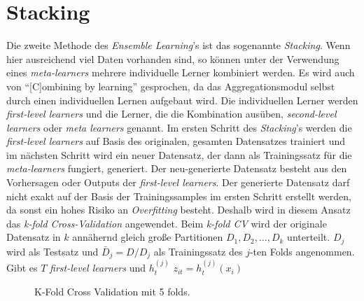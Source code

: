 \section{Stacking}
Die zweite Methode des \textit{Ensemble Learning}'s ist das sogenannte \textit{Stacking}. Wenn hier ausreichend viel Daten vorhanden sind, so können unter der Verwendung eines \textit{meta-learners} mehrere individuelle Lerner kombiniert werden. Es wird auch von \enquote{[C]ombining by learning}\autocite[S.196]{Zhou.2021} gesprochen, da das Aggregationsmodul selbst durch einen individuellen Lernen aufgebaut wird. Die individuellen Lerner werden \textit{first-level learners} und die Lerner, die die Kombination ausüben, \textit{second-level learners} oder \textit{meta learners} genannt. Im ersten Schritt des \textit{Stacking}'s werden die \textit{first-level learners} auf Basis des originalen, gesamten Datensatzes trainiert und im nächsten Schritt wird ein neuer Datensatz, der dann als Trainingssatz für die \textit{meta-learners} fungiert, generiert. Der neu-generierte Datensatz besteht aus den Vorhersagen oder Outputs der \textit{first-level learners}. Der generierte Datensatz darf nicht exakt auf der Basis der Trainingssamples im ersten Schritt erstellt werden, da sonst ein hohes Risiko an \textit{Overfitting} besteht. Deshalb wird in diesem Ansatz das \textit{k-fold Cross-Validation} angewendet. Beim \textit{k-fold CV} wird der originale Datensatz in $k$ annähernd gleich große Partitionen $D_1, D_2,\dots, D_k$ unterteilt. $D_j$ wird als Testsatz und $\bar{D}_j = D/D_j$ als Trainingssatz des $j$-ten Folds angenommen. Gibt es $T$ \textit{first-level learners} und $h_{t}^{(j)}$ $z_{it} = h_{t}^{(j)}(x_i)$

\begin{figure}
      \caption{K-Fold Cross Validation mit 5 folds.}
      \label{fig:kfoldCrossValidation}
\end{figure}

